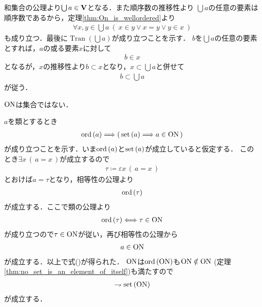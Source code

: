 	\begin{prf}
		和集合の公理より$\bigcup a \in \mathbf{V}$となる．また順序数の推移性より
		$\bigcup a$の任意の要素は順序数であるから，定理\ref{thm:On_is_wellordered}より
		\begin{align}
			\forall x,y \in \bigcup a\ (\ x \in y \vee x = y \vee y \in x\ )
		\end{align}
		も成り立つ．最後に$\operatorname{Tran}(\bigcup a)$が成り立つことを示す．
		$b$を$\bigcup a$の任意の要素とすれば，$a$の或る要素$x$に対して
		\begin{align}
			b \in x
		\end{align}
		となるが，$x$の推移性より$b \subset x$となり，$x \subset \bigcup a$と併せて
		\begin{align}
			b \subset \bigcup a
		\end{align}
		が従う．
		\QED
	\end{prf}
	
	\begin{screen}
		\begin{thm}
			$\mathrm{ON}$は集合ではない．
		\end{thm}
	\end{screen}
	
	\begin{prf}
		$a$を類とするとき
		\begin{align}
			\operatorname*{ord} \left(a\right) \Longrightarrow \left(\, \operatorname*{set} \left(a\right) \Longrightarrow a \in \mathrm{ON}\, \right)
			\label{eq:Burali_Forti_1}
		\end{align}
		が成り立つことを示す．いま$\operatorname*{ord} \left(a\right)$と$\operatorname*{set} \left(a\right)$が成立していると仮定する．
		このとき$\exists x\, (\, a = x\, )$が成立するので
		\begin{align}
			\tau \coloneqq \varepsilon x\, (\, a = x\, )
		\end{align}
		とおけば$a = \tau$となり，相等性の公理より
		\begin{align}
			\operatorname*{ord} \left(\tau\right)
		\end{align}
		が成立する．ここで類の公理より
		\begin{align}
			\operatorname*{ord} \left(\tau\right) \Longleftrightarrow \tau \in \mathrm{ON}
		\end{align}
		が成り立つので$\tau \in \mathrm{ON}$が従い，再び相等性の公理から
		\begin{align}
			a \in \mathrm{ON}
		\end{align}
		が成立する．以上で式()が得られた．
		$\mathrm{ON}$は$\operatorname*{ord} \left(\mathrm{ON}\right)$も$\mathrm{ON} \notin \mathrm{ON}$
		(定理\ref{thm:no_set_is_an_element_of_itself})も満たすので
		\begin{align}
			\rightharpoondown \operatorname*{set} \left(\mathrm{ON}\right)
		\end{align}
		が成立する．
		\QED
	\end{prf}
	
